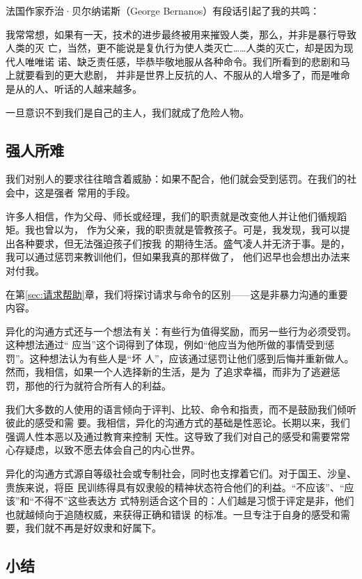 \documentclass{ctexart}
\renewenvironment{quotation}{\setlength{\parskip}{0.5em}\setstretch{1.5}\kaishu\zihao{-5}\setlength{\parindent}{1em}}{\vspace{1em}}
\newcommand{\secref}[1]{第\ref{#1}章}
\begin{document}
法国作家乔治·贝尔纳诺斯（George Bernanos）有段话引起了我的共鸣：

\begin{quotation}
	我常常想，如果有一天，技术的进步最终被用来摧毁人类，那么，并非是暴行导致人类的灭
	亡，当然，更不能说是复仇行为使人类灭亡\ldots\ldots 人类的灭亡，却是因为现代人唯唯诺
	诺、缺乏责任感，毕恭毕敬地服从各种命令。我们所看到的悲剧和马上就要看到的更大悲剧，
	并非是世界上反抗的人、不服从的人增多了，而是唯命是从的人、听话的人越来越多。
\end{quotation}

一旦意识不到我们是自己的主人，我们就成了危险人物。

\subsection{强人所难}

我们对别人的要求往往暗含着威胁：如果不配合，他们就会受到惩罚。在我们的社会中，这是强者
常用的手段。

许多人相信，作为父母、师长或经理，我们的职责就是改变他人并让他们循规蹈矩。我也曾以为，
作为父亲，我的职责就是管教孩子。可是，我发现，我可以提出各种要求，但无法强迫孩子们按我
的期待生活。盛气凌人并无济于事。是的，我可以通过惩罚来教训他们，但如果我真的那样做了，
他们迟早也会想出办法来对付我。

在\secref{sec:请求帮助}，我们将探讨请求与命令的区别------这是非暴力沟通的重要内容。

异化的沟通方式还与一个想法有关：有些行为值得奖励，而另一些行为必须受罚。这种想法通过``%
应当''这个词得到了体现，例如``他应当为他所做的事情受到惩罚''。这种想法认为有些人是``坏
人''，应该通过惩罚让他们感到后悔并重新做人。然而，我相信，如果一个人选择新的生活，是为
了追求幸福，而非为了逃避惩罚，那他的行为就符合所有人的利益。

我们大多数的人使用的语言倾向于评判、比较、命令和指责，而不是鼓励我们倾听彼此的感受和需
要。我相信，异化的沟通方式的基础是性恶论。长期以来，我们强调人性本恶以及通过教育来控制
天性。这导致了我们对自己的感受和需要常常心存疑虑，以致不愿去体会自己的内心世界。

异化的沟通方式源自等级社会或专制社会，同时也支撑着它们。对于国王、沙皇、贵族来说，将臣
民训练得具有奴隶般的精神状态符合他们的利益。``不应该''、``应该''和``不得不''这些表达方
式特别适合这个目的：人们越是习惯于评定是非，他们也就越倾向于追随权威，来获得正确和错误
的标准。一旦专注于自身的感受和需要，我们就不再是好奴隶和好属下。


\subsection{小结}
\end{document}
